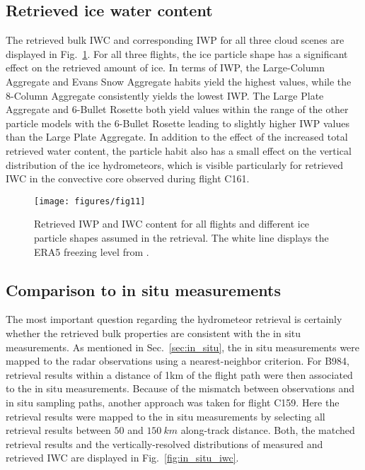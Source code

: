 \documentclass[journal abbreviation, manuscript]{copernicus}
\begin{document}
\subsection{Retrieved ice water content}

The retrieved bulk IWC and corresponding IWP for all three cloud scenes are
displayed in Fig.~\ref{fig:ice_water_content}. For all three flights, the ice
particle shape has a significant effect on the retrieved amount of ice. In terms
of IWP, the Large-Column Aggregate and Evans Snow Aggregate habits yield the
highest values, while the 8-Column Aggregate consistently yields the lowest IWP.
The Large Plate Aggregate and 6-Bullet Rosette both yield values within the
range of the other particle models with the 6-Bullet Rosette leading to slightly
higher IWP values than the Large Plate Aggregate. In addition to the effect of
the increased total retrieved water content, the particle habit also has a small
effect on the vertical distribution of the ice hydrometeors, which is visible
particularly for retrieved IWC in the convective core observed during flight
C161.


\begin{figure}[!hbpt]
  \centering
  \texttt{[image: figures/fig11]}
  \caption{Retrieved IWP and IWC content for all flights and different ice
    particle shapes assumed in the retrieval. The white line displays the ERA5
    freezing level from \citet{era5}.
  }
  \label{fig:ice_water_content}
\end{figure}

\subsection{Comparison to in situ measurements}

The most important question regarding the hydrometeor retrieval is certainly
whether the retrieved bulk properties are consistent with the in situ
measurements. As mentioned in Sec.~\ref{sec:in_situ}, the in situ measurements
were mapped to the radar observations using a nearest-neighbor criterion. For
B984, retrieval results within a distance of 1km of the flight path were then
associated to the in situ measurements. Because of the mismatch between
observations and in situ sampling paths, another approach was taken for flight
C159. Here the retrieval results were mapped to the in situ measurements by
selecting all retrieval results between $50$ and $150\ \unit{km}$ along-track
distance. Both, the matched retrieval results and the vertically-resolved
distributions of measured and retrieved IWC are displayed in
Fig.~\ref{fig:in_situ_iwc}.
\end{document}
